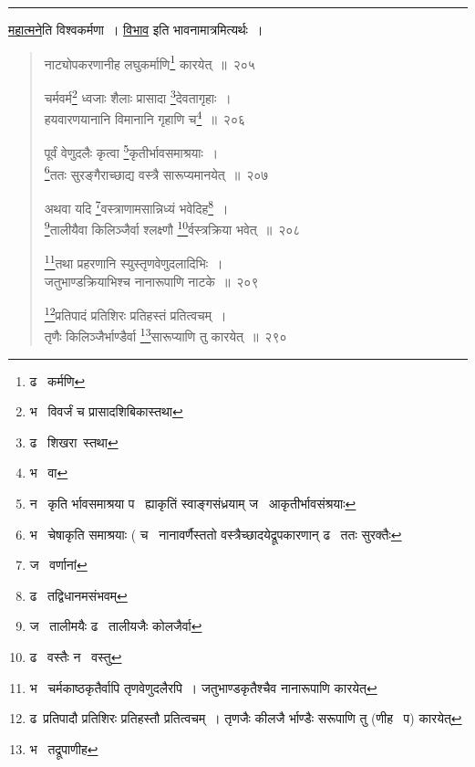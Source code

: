 \documentclass[11pt, openany]{book}
\begin{document}
\hrule

\vspace{2mm}
\noindent
\underline{महात्मने}ति विश्वकर्मणा~। \underline{विभाव} इति भावनामात्रमित्यर्थः~।

\newpage

\begin{quote}
{\na नाट्योपकरणानीह लघुकर्माणि\renewcommand{\thefootnote}{1}\footnote{ढ \textendash\ कर्मणि} कारयेत्~॥~२०५

चर्मवर्म\renewcommand{\thefootnote}{2}\footnote{भ \textendash\ विवर्जं च प्रासादशिबिकास्तथा} ध्वजाः शैलाः प्रासादा \renewcommand{\thefootnote}{3}\footnote{ढ \textendash\ शिखरा\textendash\ स्तथा}देवतागृहाः~।\\
हयवारणयानानि विमानानि गृहाणि च\renewcommand{\thefootnote}{4}\footnote{भ \textendash\ वा}~॥~२०६

पूर्वं वेणुदलैः कृत्वा \renewcommand{\thefootnote}{5}\footnote{न \textendash\ कृति र्भावसमाश्रया प \textendash\ ह्याकृतिं स्वाङ्गसंध्रयाम् ज \textendash\ आकृतीर्भावसंश्रयाः}कृतीर्भावसमाश्रयाः~।\\
\renewcommand{\thefootnote}{6}\footnote{भ \textendash\ चेषाकृति समाश्रयाः ( च \textendash\ नानावर्णैस्ततो वस्त्रैच्छादयेद्रूपकारणान् ढ \textendash\ ततः सुरक्तैः}ततः सुरङ्गैराच्छाद्य वस्त्रै सारूप्यमानयेत्~॥~२०७

अथवा यदि \renewcommand{\thefootnote}{7}\footnote{ज \textendash\ वर्णानां}वस्त्राणामसान्निध्यं भवेदिह\renewcommand{\thefootnote}{8}\footnote{ढ \textendash\ तद्विधानमसंभवम्}~।\\
\renewcommand{\thefootnote}{9}\footnote{ज \textendash\ तालीमयैः ढ \textendash\ तालीयजैः कोलजैर्वा}तालीयैवा किलिञ्जैर्वा श्लक्ष्णौ \renewcommand{\thefootnote}{10}\footnote{ढ \textendash\ वस्तैः न \textendash\ वस्तु}र्वस्त्रक्रिया भवेत्~॥~२०८

\renewcommand{\thefootnote}{11}\footnote{भ \textendash\ चर्मकाष्ठकृतैर्वापि तृणवेणुदलैरपि~। जतुभाण्डकृतैश्चैव नानारूपाणि कारयेत्}तथा प्रहरणानि स्युस्तृणवेणुदलादिभिः~।\\
जतुभाण्डक्रियाभिश्च नानारूपाणि नाटके~॥~२०९

\renewcommand{\thefootnote}{12}\footnote{ढ\textendash\ प्रतिपादौ प्रतिशिरः प्रतिहस्तौ प्रतित्वचम्~। तृणजैः कीलजै र्भाण्डैः सरूपाणि तु (णीह \textendash\ प) कारयेत्}प्रतिपादं प्रतिशिरः प्रतिहस्तं प्रतित्वचम्~।\\
तृणैः किलिञ्जैर्भाण्डैर्वा \renewcommand{\thefootnote}{13}\footnote{भ \textendash\ तद्रूपाणीह}सारूप्याणि तु कारयेत्~॥~२९०}
\end{quote}
\end{document}
